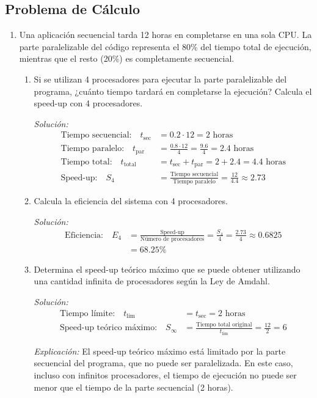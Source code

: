 \documentclass[12pt,a4paper]{article}
\begin{document}
	\subsection{Problema de Cálculo}
	\begin{enumerate}
		\item Una aplicación secuencial tarda 12 horas en completarse en una sola CPU. La parte paralelizable del código representa el 80\% del tiempo total de ejecución, mientras que el resto (20\%) es completamente secuencial.
		
		\begin{enumerate}
			\item Si se utilizan 4 procesadores para ejecutar la parte paralelizable del programa, ¿cuánto tiempo tardará en completarse la ejecución? Calcula el speed-up con 4 procesadores.
			
			\textit{Solución:}
			\begin{align*}
				\text{Tiempo secuencial:} \quad t_{\text{sec}} &= 0.2 \cdot 12 = 2 \text{ horas} \\[1ex]
				\text{Tiempo paralelo:} \quad t_{\text{par}} &= \frac{0.8 \cdot 12}{4} = \frac{9.6}{4} = 2.4 \text{ horas} \\[1ex]
				\text{Tiempo total:} \quad t_{\text{total}} &= t_{\text{sec}} + t_{\text{par}} = 2 + 2.4 = 4.4 \text{ horas} \\[1ex]
				\text{Speed-up:} \quad S_4 &= \frac{\text{Tiempo secuencial}}{\text{Tiempo paralelo}} = \frac{12}{4.4} \approx 2.73
			\end{align*}
			
			\item Calcula la eficiencia del sistema con 4 procesadores.
			
			\textit{Solución:}
			\begin{align*}
				\text{Eficiencia:} \quad E_4 &= \frac{\text{Speed-up}}{\text{Número de procesadores}} = \frac{S_4}{4} = \frac{2.73}{4} \approx 0.6825 \\[1ex]
				&= 68.25\%
			\end{align*}
			
			\item Determina el speed-up teórico máximo que se puede obtener utilizando una cantidad infinita de procesadores según la Ley de Amdahl.
			
			\textit{Solución:}
			\begin{align*}
				\text{Tiempo límite:} \quad t_{\text{lim}} &= t_{\text{sec}} = 2 \text{ horas} \\[1ex]
				\text{Speed-up teórico máximo:} \quad S_{\infty} &= \frac{\text{Tiempo total original}}{t_{\text{lim}}} = \frac{12}{2} = 6
			\end{align*}
			
			\textit{Explicación:} El speed-up teórico máximo está limitado por la parte secuencial del programa, que no puede ser paralelizada. En este caso, incluso con infinitos procesadores, el tiempo de ejecución no puede ser menor que el tiempo de la parte secuencial (2 horas).
		\end{enumerate}
	\end{enumerate}
	
\end{document}
